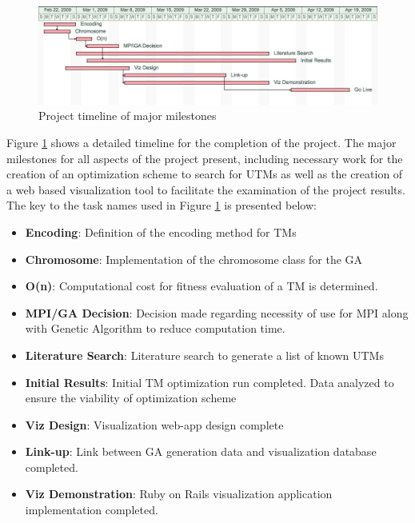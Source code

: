 \begin{figure}[htp]
\centering
\includegraphics[width=1\textwidth]{images/gantt.png}
\caption{Project timeline of major milestones}\label{fig:gantt}
\end{figure}
Figure \ref{fig:gantt} shows a detailed timeline for the completion of the project. The major milestones for all aspects of the project present, including necessary work for the creation of an optimization scheme to search for UTMs as well as the creation of a web based visualization tool to facilitate the examination of the project results. The key to the task names used in Figure \ref{fig:gantt} is presented below: 
\begin{itemize}
	\item {\bf Encoding}:	Definition of the encoding method for TMs
	\item {\bf Chromosome}: Implementation of the chromosome class for the GA
	\item {\bf O(n)}:	Computational cost for fitness evaluation of a TM is determined.
	\item {\bf MPI/GA Decision}:	Decision made regarding necessity of use for MPI along with Genetic Algorithm to reduce computation time.
	\item {\bf Literature Search}: Literature search to generate a list of known UTMs
	\item {\bf Initial Results}: Initial TM optimization run completed. Data analyzed to ensure the viability of optimization scheme
	\item {\bf Viz Design}: Visualization web-app design complete
	\item {\bf Link-up}: Link between GA generation data and visualization database completed.
	\item {\bf Viz Demonstration}: Ruby on Rails visualization application implementation completed.
\end{itemize}
